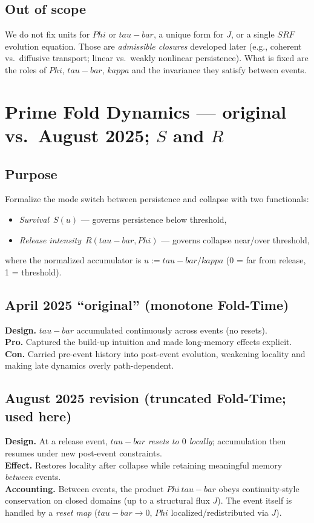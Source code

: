 \documentclass[12pt]{article}
\newcommand{\FoldDensity}{\Phi}
\newcommand{\FoldTime}{\bar{\tau}}
\newcommand{\Threshold}{\kappa}
\newcommand{\Survival}{S}
\newcommand{\Release}{R}
\newcommand{\SRF}{\mathcal{F}_{\mathrm{SR}}}
\def\FoldDensity{Phi}%
\def\FoldTime{tau-bar}%
\def\Threshold{kappa}%
\def\SRF{SRF}%
\def\Survival{S}%
\def\Release{R}%
\def\bar#1{#1}%
\def\mathcal#1{#1}%
\def\mathrm#1{#1}%
\begin{document}
\subsection{Out of scope}
We do not fix units for $\FoldDensity$ or $\FoldTime$, a unique form for $J$, or a single $\SRF$ evolution equation.
Those are \emph{admissible closures} developed later (e.g., coherent vs.\ diffusive transport; linear vs.\ weakly nonlinear persistence).
What is fixed are the roles of $\FoldDensity$, $\FoldTime$, $\Threshold$ and the invariance they satisfy between events.

\section[Prime Fold Dynamics — original vs. August 2025; S and R]{Prime Fold Dynamics — original vs.\ August 2025; $\Survival$ and $\Release$}

\subsection{Purpose}
Formalize the mode switch between persistence and collapse with two functionals:
\begin{itemize}
  \item \emph{Survival} $\,\Survival(u)$ — governs persistence below threshold,
  \item \emph{Release intensity} $\,\Release(\FoldTime,\FoldDensity)$ — governs collapse near/over threshold,
\end{itemize}
where the normalized accumulator is $u := \FoldTime/\Threshold$ (0 = far from release, 1 = threshold).

\subsection{April 2025 ``original'' (monotone Fold-Time)}
\textbf{Design.} $\FoldTime$ accumulated continuously across events (no resets).\\
\textbf{Pro.} Captured the build-up intuition and made long-memory effects explicit.\\
\textbf{Con.} Carried pre-event history into post-event evolution, weakening locality and making late dynamics overly path-dependent.

\subsection{August 2025 revision (truncated Fold-Time; used here)}
\textbf{Design.} At a release event, $\FoldTime$ \emph{resets to $0$ locally}; accumulation then resumes under new post-event constraints.\\
\textbf{Effect.} Restores locality after collapse while retaining meaningful memory \emph{between} events.\\
\textbf{Accounting.} Between events, the product $\FoldDensity\,\FoldTime$ obeys continuity-style conservation on closed domains (up to a structural flux $J$). The event itself is handled by a \emph{reset map} ($\FoldTime\!\to\!0$, $\FoldDensity$ localized/redistributed via $J$).
\end{document}
